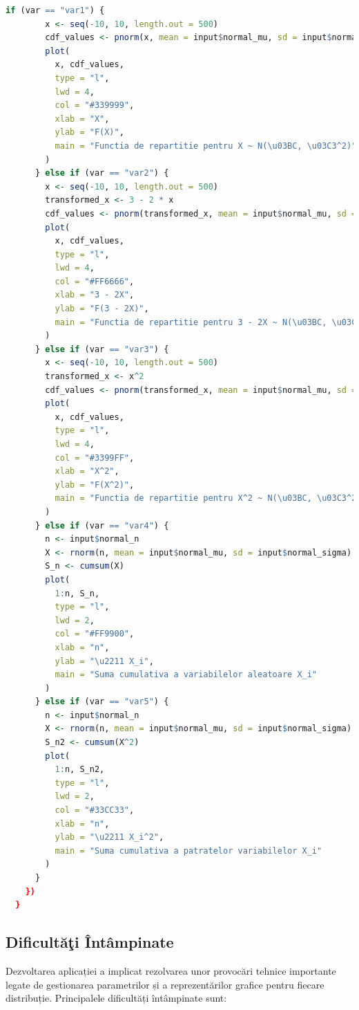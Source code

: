 \documentclass[a4paper,11pt]{article}
\begin{document}
\begin{lstlisting}[language=R]
      if (var == "var1") {
        x <- seq(-10, 10, length.out = 500)
        cdf_values <- pnorm(x, mean = input$normal_mu, sd = input$normal_sigma)
        plot(
          x, cdf_values,
          type = "l",
          lwd = 4,
          col = "#339999",
          xlab = "X",
          ylab = "F(X)",
          main = "Functia de repartitie pentru X ~ N(\u03BC, \u03C3^2)"
        )
      } else if (var == "var2") {
        x <- seq(-10, 10, length.out = 500)
        transformed_x <- 3 - 2 * x
        cdf_values <- pnorm(transformed_x, mean = input$normal_mu, sd = input$normal_sigma)
        plot(
          x, cdf_values,
          type = "l",
          lwd = 4,
          col = "#FF6666",
          xlab = "3 - 2X",
          ylab = "F(3 - 2X)",
          main = "Functia de repartitie pentru 3 - 2X ~ N(\u03BC, \u03C3^2)"
        )
      } else if (var == "var3") {
        x <- seq(-10, 10, length.out = 500)
        transformed_x <- x^2
        cdf_values <- pnorm(transformed_x, mean = input$normal_mu, sd = input$normal_sigma)
        plot(
          x, cdf_values,
          type = "l",
          lwd = 4,
          col = "#3399FF",
          xlab = "X^2",
          ylab = "F(X^2)",
          main = "Functia de repartitie pentru X^2 ~ N(\u03BC, \u03C3^2)"
        )
      } else if (var == "var4") {
        n <- input$normal_n
        X <- rnorm(n, mean = input$normal_mu, sd = input$normal_sigma)
        S_n <- cumsum(X)
        plot(
          1:n, S_n,
          type = "l",
          lwd = 2,
          col = "#FF9900",
          xlab = "n",
          ylab = "\u2211 X_i",
          main = "Suma cumulativa a variabilelor aleatoare X_i"
        )
      } else if (var == "var5") {
        n <- input$normal_n
        X <- rnorm(n, mean = input$normal_mu, sd = input$normal_sigma)
        S_n2 <- cumsum(X^2)
        plot(
          1:n, S_n2,
          type = "l",
          lwd = 2,
          col = "#33CC33",
          xlab = "n",
          ylab = "\u2211 X_i^2",
          main = "Suma cumulativa a patratelor variabilelor X_i"
        )
      }
    })
  }
\end{lstlisting}

\subsection*{Dificult\u{a}\c{t}i Întâmpinate}

Dezvoltarea aplicației a implicat rezolvarea unor provocări tehnice importante legate de gestionarea parametrilor și a reprezentărilor grafice pentru fiecare distribuție. Principalele dificultăți întâmpinate sunt:
\end{document}
